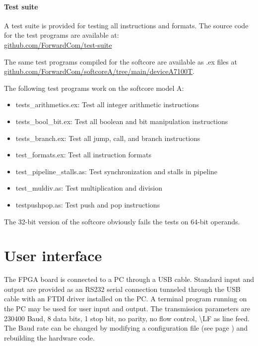 \documentclass[11pt,a4paper,oneside,openright]{report}
\newcommand{\vv}{ \vspace{2mm} }   %
\begin{document}
\subsubsection{Test suite}
A test suite is provided for testing all instructions and formats. The source code for the test programs are available at:\\

\href{https://github.com/ForwardCom/test-suite}{github.com/ForwardCom/test-suite}
\vv

The same test programs compiled for the softcore are available as .ex files at \\
\href{https://github.com/ForwardCom/softcoreA/tree/main/deviceA7100T}{github.com/ForwardCom/softcoreA/tree/main/deviceA7100T}.
\vv

The following test programs work on the softcore model A:
\begin{itemize}
\item tests\_arithmetics.ex: Test all integer arithmetic instructions
\item tests\_bool\_bit.ex: Test all boolean and bit manipulation instructions
\item tests\_branch.ex: Test all jump, call, and branch instructions
\item test\_formats.ex: Test all instruction formats
\item test\_pipeline\_stalls.as: Test synchronization and stalls in pipeline
\item test\_muldiv.as: Test multiplication and division
\item testpushpop.as: Test push and pop instructions
\end{itemize}
\vv

The 32-bit version of the softcore obviously fails the tests on 64-bit operands.
\vv


\chapter{User interface}
The FPGA board is connected to a PC through a USB cable. Standard input and output are provided as an RS232 serial connection tunneled through the USB cable with an FTDI driver installed on the PC. A terminal program running on the PC may be used for user input and output. The transmission parameters are 230400 Baud, 8 data bits, 1 stop bit, no parity, no flow control, 
\textbackslash{LF} as line feed. The Baud rate can be changed by modifying a configuration file (see page \pageref{SettingConfiguration}) and rebuilding the hardware code.
\vv
\end{document}

